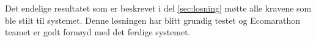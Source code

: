 Det endelige resultatet som er beskrevet i del \ref{sec:losning} møtte alle kravene som ble stilt til systemet. Denne løsningen har blitt grundig testet og Ecomarathon teamet er godt fornøyd med det ferdige systemet.
